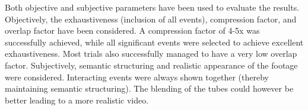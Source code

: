 \justify Both objective and subjective parameters have been used to
evaluate the results. Objectively, the exhaustiveness (inclusion of all
events), compression factor, and overlap factor have been considered. A
compression factor of 4-5x was successfully achieved, while all significant
events were selected to achieve excellent exhaustiveness. Most trials also
successfully managed to have a very low overlap factor.
Subjectively, semantic structuring and realistic appearance of the footage
were considered. Interacting events were always shown together (thereby
maintaining semantic structuring). The blending of the tubes could
however be better leading to a more realistic video.

\bigskip


\pagebreak

\cleardoublepage


\tableofcontents
\listoftables
\listoffigures
\printglossary[type=\acronymtype,style=long,title=Glossary,nonumberlist]

\cleardoublepage